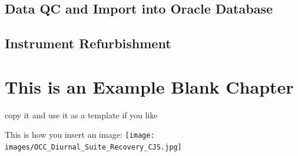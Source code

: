 \documentclass[]{book}
\begin{document}
\hypertarget{data-qc-and-import-into-oracle-database}{%
\section{Data QC and Import into Oracle Database}\label{data-qc-and-import-into-oracle-database}}

\hypertarget{instrument-refurbishment}{%
\section{Instrument Refurbishment}\label{instrument-refurbishment}}

\hypertarget{this-is-an-example-blank-chapter}{%
\chapter{This is an Example Blank Chapter}\label{this-is-an-example-blank-chapter}}

copy it and use it as a template if you like

This is how you insert an image:
\texttt{[image: images/OCC\_Diurnal\_Suite\_Recovery\_CJS.jpg]}
\end{document}
